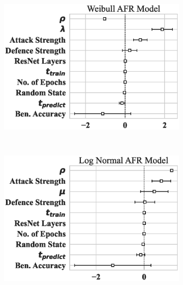 \begin{figure}
    \begin{subfigure}{0.32\textwidth}
        \centering
        \includegraphics[width=\textwidth]{cifar100/weibull_aft.eps}
    \end{subfigure}%
    ~ 
    \begin{subfigure}{0.32\textwidth}
        \centering
        \includegraphics[width=\textwidth]{cifar100/log_normal_aft.eps}
    \end{subfigure}
    ~
    \begin{subfigure}{0.32\textwidth}
        \centering

\end{subfigure}
\end{figure}
